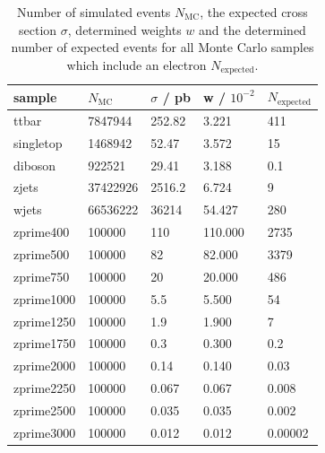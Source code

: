 
\begin{table}[H]
  \centering
  \caption{Number of simulated events $N_\text{MC}$, the expected cross section $\sigma$, determined weights $w$ and the determined number of
  expected events for all Monte Carlo samples which include an electron $N_\text{expected}$.}
  \begin{tabular}{l|llll}
      sample           &  $N_\text{MC}$  & $\sigma$ / pb & w / $10^{-2}$ & $N_\text{expected}$ \\
      \hline
      ttbar      & 7847944    & 252.82    &    3.221   &     411       \\
      singletop  & 1468942    & 52.47     &    3.572   &     15       \\
      diboson    & 922521     & 29.41     &    3.188   &         0.1       \\
      zjets      & 37422926   & 2516.2    &    6.724   &     9       \\
      wjets      & 66536222   & 36214     &   54.427   &     280       \\
      zprime400  & 100000     & 110       &  110.000   &     2735       \\
      zprime500  & 100000     & 82        &   82.000   &     3379       \\
      zprime750  & 100000     & 20        &   20.000   &     486       \\
      zprime1000 & 100000     & 5.5       &    5.500   &     54       \\
      zprime1250 & 100000     & 1.9       &    1.900   &     7       \\
      zprime1750 & 100000     & 0.3       &    0.300   &     0.2       \\
      zprime2000 & 100000     & 0.14      &    0.140   &     0.03       \\
      zprime2250 & 100000     & 0.067     &    0.067   &     0.008       \\
      zprime2500 & 100000     & 0.035     &    0.035   &     0.002       \\
      zprime3000 & 100000     & 0.012     &    0.012   &     0.00002       \\
      \end{tabular}
\label{tab:agree}

  \end{table}

